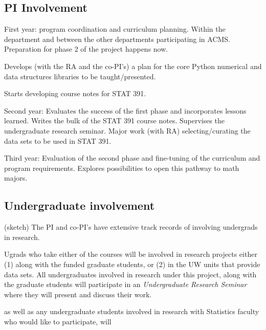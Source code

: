 \subsection{PI Involvement}

\bit
\item First year: program coordination and curriculum planning. Within the department and between the other departments participating in ACMS. Preparation for phase 2 of the project happens now. 

Develops (with the RA and the co-PI's) a plan for the core Python numerical and data structures libraries to be taught/presented. 

Starts developing course notes for STAT 391. 

\item Second year: Evaluates the success of the first phase and
  incorporates lessons learned. Writes the bulk of the STAT 391 course
  notes. Supervises the undergraduate research seminar. Major work (with RA) 
  selecting/curating the data sets to be used in STAT 391.

\item Third year: Evaluation of the second phase and fine-tuning of
  the curriculum and program requirements. Explores possibilities to
  open this pathway to math majors.
 \eit

\subsection{Undergraduate involvement}

(sketch)
The PI and co-PI's have extensive track records of involving
undergrads in research. 

Ugrads who take either of the courses will be involved in research
projects either (1) along with the funded graduate students, or (2) in
the UW units that provide data sets. All undergraduates involved in
research under this project, along with the graduate students will
participate in an {\em Undergraduate Research Seminar} where they will
present and discuss their work. 

as well as any undergraduate students
involved in research with Statistics faculty who would like to
participate, will
